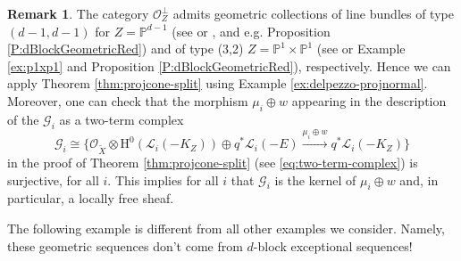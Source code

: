 \documentclass[a4paper,11pt, reqno]{amsart}
\def\P{\mathbb P}
\def\OO{\mathcal O}
\def\sG{\mathscr{G}}
\def\sL{\mathscr{L}}
\theoremstyle{plain}
\theoremstyle{definition}
\newtheorem{remark}[dummy]{Remark}
\numberwithin{equation}{section}
\newlength{\arrow}
\begin{document}
\begin{remark}
    The category $\OO_Z^\perp$ admits geometric collections of line bundles of type $(d-1, d-1)$ for $Z = \P^{d-1}$ (see \cite[Example 2.9]{bondal-polishchuk} or \cite[Example 3.3 (a)]{BridgelandStern}, and e.g. Proposition \ref{P:dBlockGeometricRed}) and of type (3,2) $Z = \P^1\times \P^1$ (see \cite[Example 3.3 (b)]{BridgelandStern} or Example \ref{ex:p1xp1} and  Proposition \ref{P:dBlockGeometricRed}), respectively.
    Hence we can apply Theorem \ref{thm:projcone-split} using Example \ref{ex:delpezzo-projnormal}.
    Moreover, one can check that the morphism $\mu_i \oplus w$ appearing in the description of the $\sG_i$ as a two-term complex
    \[
    \sG_i \cong \{ \OO_{\tilde{X}} \otimes \mathrm{H}^0 ( \sL_i (-K_Z) ) \oplus q^\ast\sL_i(-E)  \xrightarrow{\mu_i \oplus w} q^\ast\sL_i (-K_Z) \}
    \]
    in the proof of Theorem \ref{thm:projcone-split} (see \ref{eq:two-term-complex}) is surjective, for all $i$.
    This implies for all $i$ that $\sG_i$ is the kernel of $\mu_i \oplus w$ and, in particular, a locally free sheaf.
\end{remark}


The following example is different from all other examples we consider. Namely, these geometric sequences  don't come from $d$-block exceptional sequences!
\end{document}
